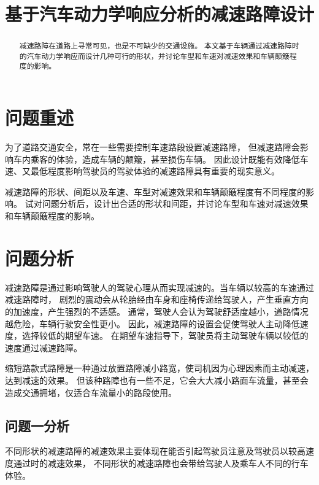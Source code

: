 \documentclass[withoutpreface,bwprint]{cumcmthesis}
\title{基于汽车动力学响应分析的减速路障设计}
\begin{document}
\maketitle
\begin{abstract}

减速路障在道路上寻常可见，也是不可缺少的交通设施。
本文基于车辆通过减速路障时的汽车动力学响应而设计几种可行的形状，并讨论车型和车速对减速效果和车辆颠簸程度的影响。

\end{abstract}

\section{问题重述}

为了道路交通安全，常在一些需要控制车速路段设置减速路障，
但减速路障会影响车内乘客的体验，造成车辆的颠簸，甚至损伤车辆。
因此设计既能有效降低车速、又最低程度影响驾驶员的驾驶体验的减速路障具有重要的现实意义。

减速路障的形状、间距以及车速、车型对减速效果和车辆颠簸程度有不同程度的影响。
试对问题分析后，设计出合适的形状和间距，并讨论车型和车速对减速效果和车辆颠簸程度的影响。

\section{问题分析}

减速路障是通过影响驾驶人的驾驶心理从而实现减速的。当车辆以较高的车速通过减速路障时，
剧烈的震动会从轮胎经由车身和座椅传递给驾驶人，产生垂直方向的加速度，产生强烈的不适感。
通常，驾驶人会认为驾驶舒适度越小，道路情况越危险，车辆行驶安全性更小。
因此，减速路障的设置会促使驾驶人主动降低速度，选择较低的期望车速。
在期望车速指导下，驾驶员将主动驾驶车辆以较低的速度通过减速路障。

缩短路款式路障是一种通过放置路障减小路宽，使司机因为心理因素而主动减速，达到减速的效果。
但该种路障也有一些不足，它会大大减小路面车流量，甚至会造成交通拥堵，仅适合车流量小的路段使用。

\subsection{问题一分析}

不同形状的减速路障的减速效果主要体现在能否引起驾驶员注意及驾驶员以较高速度通过时的减速效果，
不同形状的减速路障也会带给驾驶人及乘车人不同的行车体验。
\end{document}
